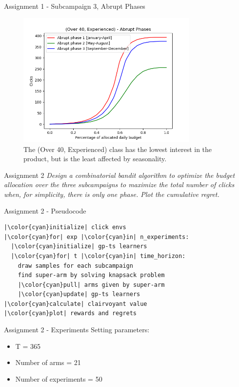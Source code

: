 \documentclass[11pt]{beamer}
\begin{document}
\begin{frame}{Assignment 1 - Subcampaign 3, Abrupt Phases}
\begin{figure}[hbtp]
\centering
\includegraphics[width=0.8\textwidth]{images/subcampaign_1_abrupt_phases.png}
\caption{The (Over 40, Experienced) class has the lowest interest in the product, but is the least affected by seasonality.}
\end{figure}
\end{frame}

\begin{frame}{Assignment 2}
\textit{Design a combinatorial bandit algorithm to optimize the budget allocation over the three subcampaigns to maximize the total number of clicks when, for simplicity, there is only one phase. Plot the cumulative regret.}
\end{frame}

\begin{frame}[fragile]{Assignment 2 - Pseudocode}
\begin{lstlisting}
|\color{cyan}initialize| click envs
|\color{cyan}for| exp |\color{cyan}in| n_experiments:
  |\color{cyan}initialize| gp-ts learners
  |\color{cyan}for| t |\color{cyan}in| time_horizon:
    draw samples for each subcampaign
    find super-arm by solving knapsack problem
    |\color{cyan}pull| arms given by super-arm
    |\color{cyan}update| gp-ts learners
|\color{cyan}calculate| clairvoyant value
|\color{cyan}plot| rewards and regrets
\end{lstlisting}
\end{frame}

\begin{frame}{Assignment 2 - Experiments}
Setting parameters:
\begin{itemize}
\item T = 365
\item Number of arms = 21
\item Number of experiments = 50
\end{itemize}
\end{frame}
\end{document}
